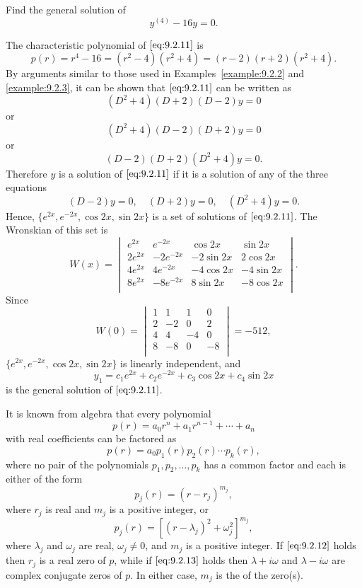 \documentclass{ximera}
\begin{document}
\begin{example}\label{example:9.2.4}
Find the general solution of
\begin{equation} \label{eq:9.2.11}
y^{(4)}-16y=0.
\end{equation}


\begin{explanation}
The characteristic polynomial of
$\eqref{eq:9.2.11}$ is
$$
p(r)=r^4-16=(r^2-4)(r^2+4)=(r-2)(r+2)(r^2+4).
$$
By arguments similar to those used in Examples~\ref{example:9.2.2} and
\ref{example:9.2.3}, it can be shown that $\eqref{eq:9.2.11}$ can be written
as
$$
(D^2+4)(D+2)(D-2)y=0
$$
or
$$
(D^2+4)(D-2)(D+2)y=0
$$
or
$$
(D-2)(D+2)(D^2+4)y=0.
$$
Therefore $y$ is a solution of $\eqref{eq:9.2.11}$ if it is a solution of any of the three  equations
$$
 (D-2)y=0,\quad (D+2)y=0, \quad(D^2+4)y=0.
$$
Hence, $\{e^{2x},e^{-2x},\cos2x,\sin2x\}$ is a set of solutions of
$\eqref{eq:9.2.11}$. The Wronskian of this set is
$$
W(x)=\begin{vmatrix}
e^{2x}&e^{-2x}&\cos2x&\sin2x\\
2e^{2x}&-2e^{-2x}&-2\sin2x&2\cos2x\\
4e^{2x}&4e^{-2x}&-4\cos2x&-4\sin2x\\
8e^{2x}&-8e^{-2x}&8\sin2x&-8\cos2x\\
\end{vmatrix}.
$$
Since
$$
W(0)=\begin{vmatrix}
1&1&1&0\\
2&-2&0&2\\
4&4&-4&0\\
8&-8&0&-8\\
\end{vmatrix}=-512,
$$
 $\{e^{2x},e^{-2x},\cos2x,\sin2x\}$ is linearly independent,
and
$$
y_1=c_1e^{2x}+c_2e^{-2x}+c_3\cos2x+c_4\sin2x
$$
is the general solution of $\eqref{eq:9.2.11}$.
\end{explanation}
\end{example}

It is known from algebra that every polynomial
$$
p(r)=a_0r^n+a_1r^{n-1}+\cdots+a_n
$$
with real coefficients can be factored as
$$
p(r)=a_0p_1(r)p_2(r)\cdots p_k(r),
$$
where no pair of the polynomials $p_1, p_2, \dots, p_k$  has a common
factor and each  is either of the form
\begin{equation} \label{eq:9.2.12}
p_j(r)=(r-r_j)^{m_j},
\end{equation}
where $r_j$ is real and $m_j$ is a positive integer, or
\begin{equation} \label{eq:9.2.13}
p_j(r)=\left[(r-\lambda_j)^2+\omega_j^2\right]^{m_j},
\end{equation}
where $\lambda_j$ and $\omega_j$ are real, $\omega_j\neq 0$, and $m_j$
is a positive integer. If $\eqref{eq:9.2.12}$ holds then $r_j$ is a real
zero of $p$, while if $\eqref{eq:9.2.13}$ holds then $\lambda+i\omega$
and $\lambda-i\omega$ are complex conjugate zeros of $p$. In either
case, $m_j$ is the  of the zero(s).
\end{document}
